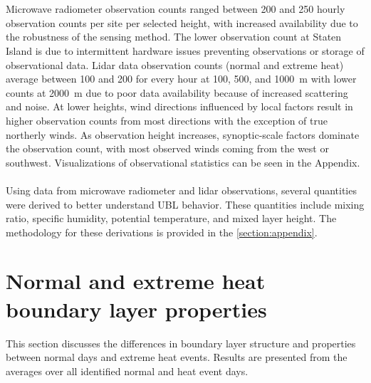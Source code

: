 \documentclass[11pt,a4paper]{article}
\begin{document}
\\ \\
Microwave radiometer observation counts ranged between 200 and 250 hourly observation counts per site per selected height, with increased availability due to the robustness of the sensing method. The lower observation count at Staten Island is due to intermittent hardware issues preventing observations or storage of observational data. Lidar data observation counts (normal and extreme heat) average between 100 and 200 for every hour at 100, 500, and \SI{1000}{\meter} with lower counts at \SI{2000}{\meter} due to poor data availability because of increased scattering and noise. At lower heights, wind directions influenced by local factors result in higher observation counts from most directions with the exception of true northerly winds. As observation height increases, synoptic-scale factors dominate the observation count, with most observed winds coming from the west or southwest. Visualizations of observational statistics can be seen in the Appendix.
\\ \\
Using data from microwave radiometer and lidar observations, several quantities were derived to better understand UBL behavior. These quantities include mixing ratio, specific humidity, potential temperature, and mixed layer height. The methodology for these derivations is provided in the \ref{section:appendix}.

\section{Normal and extreme heat boundary layer properties} \label{section:normal_extreme_properties}
This section discusses the differences in boundary layer structure and properties between normal days and extreme heat events. Results are presented from the averages over all identified normal and heat event days.
\end{document}
